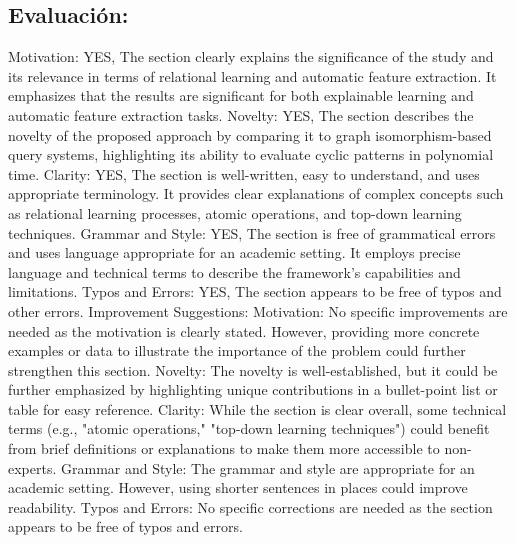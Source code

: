\documentclass{article}%
\begin{document}
\subsection{Evaluación:}%
\label{subsec:Evaluacin}%
Motivation: YES, The section clearly explains the significance of the study and its relevance in terms of relational learning and automatic feature extraction. It emphasizes that the results are significant for both explainable learning and automatic feature extraction tasks.\newline%
\newline%
Novelty: YES, The section describes the novelty of the proposed approach by comparing it to graph isomorphism{-}based query systems, highlighting its ability to evaluate cyclic patterns in polynomial time.\newline%
\newline%
Clarity: YES, The section is well{-}written, easy to understand, and uses appropriate terminology. It provides clear explanations of complex concepts such as relational learning processes, atomic operations, and top{-}down learning techniques.\newline%
\newline%
Grammar and Style: YES, The section is free of grammatical errors and uses language appropriate for an academic setting. It employs precise language and technical terms to describe the framework's capabilities and limitations.\newline%
\newline%
Typos and Errors: YES, The section appears to be free of typos and other errors.\newline%
\newline%
Improvement Suggestions:\newline%
\newline%
Motivation: No specific improvements are needed as the motivation is clearly stated. However, providing more concrete examples or data to illustrate the importance of the problem could further strengthen this section.\newline%
\newline%
Novelty: The novelty is well{-}established, but it could be further emphasized by highlighting unique contributions in a bullet{-}point list or table for easy reference.\newline%
\newline%
Clarity: While the section is clear overall, some technical terms (e.g., "atomic operations," "top{-}down learning techniques") could benefit from brief definitions or explanations to make them more accessible to non{-}experts.\newline%
\newline%
Grammar and Style: The grammar and style are appropriate for an academic setting. However, using shorter sentences in places could improve readability.\newline%
\newline%
Typos and Errors: No specific corrections are needed as the section appears to be free of typos and errors.
\end{document}
